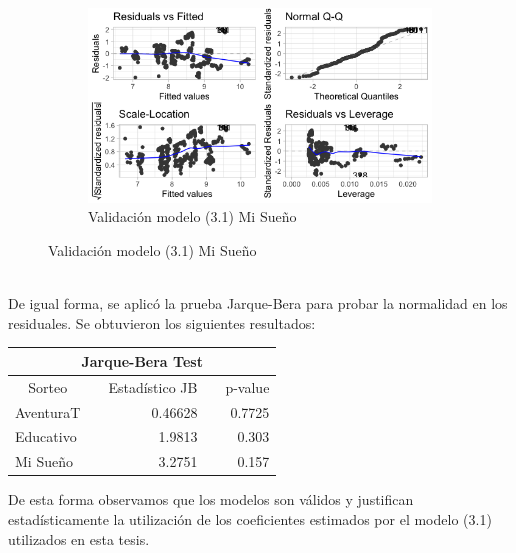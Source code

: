 \begin{figure}[H]
\centering
\label{fig:Validacion2}
\begin{subfigure}
  \centering
  \caption{Validación modelo (3.1) Mi Sueño}
  \includegraphics[width=.85\linewidth]{Imagenes/log_suen.png}
\end{subfigure}%
\end{figure}

\\

De igual forma, se aplicó la prueba Jarque-Bera para probar la normalidad en los residuales. Se obtuvieron los siguientes resultados:

\begin{table}[H]
\centering
\begin{tabular}{@{}lrrlr@{}}
\toprule
\multicolumn{5}{c}{Jarque-Bera Test}                                                                \\ \midrule
\multicolumn{1}{c}{Sorteo} & \multicolumn{1}{c}{} & \multicolumn{1}{c}{Estadístico JB} &  & p-value \\ \midrule
AventuraT                  &                      & 0.46628                            &  & 0.7725  \\
Educativo                  &                      & 1.9813                             &  & 0.303   \\
Mi Sueño                   &                      & 3.2751                             &  & 0.157   \\ \bottomrule
\end{tabular}
\end{table}

De esta forma observamos que los modelos son válidos y justifican estadísticamente la utilización de los coeficientes estimados por el modelo (3.1) utilizados en esta tesis.

\noindent 
